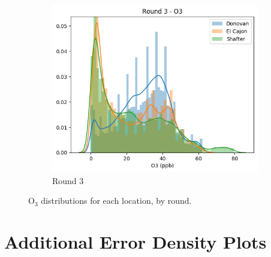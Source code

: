 \documentclass[journal abbreviation, manuscript]{copernicus}
\newcommand{\textus}[1]{$_{\text{#1}}$}
\begin{document}
\begin{figure}[H]
\begin{subfigure}{0.32\textwidth}
\includegraphics[width=\textwidth]{results/distributions/round3_o3.png}
\caption{Round 3}
\end{subfigure}
\caption{O\textus{3} distributions for each location, by round.}
\label{fig:o3-rounds}
\end{figure}

\section{Additional Error Density Plots}\label{sec:remaining-error-density-plots}
\end{document}
